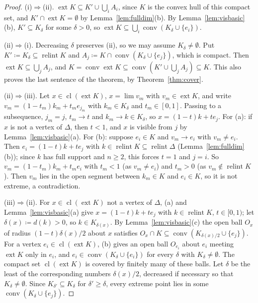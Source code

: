 \documentclass[11pt]{article}
\DeclareMathOperator{\conv}{conv}
\DeclareMathOperator{\relint}{relint}
\DeclareMathOperator{\ext}{ext}
\DeclareMathOperator{\cl}{cl}
\theoremstyle{plain}
\theoremstyle{definition}
\theoremstyle{remark}
\begin{document}
\begin{proof}
(i)$\Rightarrow$(ii). $\ext K\subseteq K'\cup\bigcup_iA_i$, since $K$ is the convex hull of
this compact set, and $K'\cap\ext K=\emptyset$ by Lemma~\ref{lem:fulldim}(b). By
Lemma~\ref{lem:visbasic}(b), $K'\subseteq K_\delta$ for some $\delta>0$, so $\ext
K\subseteq\bigcup_i\conv(K_\delta\cup\{e_i\})$.

(ii)$\Rightarrow$(i). Decreasing $\delta$ preserves (ii), so we may assume $K_\delta\neq
\emptyset$. Put $K'\coloneqq K_\delta\subseteq\relint K$ and $A_j\coloneqq K\cap
\conv(K_\delta\cup\{e_j\})$, which is compact. Then $\ext K\subseteq\bigcup_jA_j$, and
$K=\conv\ext K\subseteq\conv(K'\cup\bigcup_jA_j)\subseteq K$. This also proves the last
sentence of the theorem, by Theorem~\ref{thm:cover}.

(ii)$\Rightarrow$(iii). Let $x\in\cl(\ext K)$, $x=\lim v_m$ with $v_m\in\ext K$, and write
$v_m=(1-t_m)k_m+t_me_{j_m}$ with $k_m\in K_\delta$ and $t_m\in[0,1]$. Passing to a
subsequence, $j_m=j$, $t_m\to t$ and $k_m\to k\in K_\delta$, so $x=(1-t)k+te_j$. For (a):
if $x$ is not a vertex of $\Delta$, then $t<1$, and $x$ is visible from $j$ by
Lemma~\ref{lem:visbasic}(a). For (b): suppose $e_i\in K$ and $v_m\to e_i$ with $v_m\neq
e_i$. Then $e_i=(1-t)k+te_j$ with $k\in\relint K\subseteq\relint\Delta$
(Lemma~\ref{lem:fulldim}(b)); since $k$ has full support and $n\ge2$, this forces $t=1$
and $j=i$. So $v_m=(1-t_m)k_m+t_me_i$ with $t_m<1$ (as $v_m\ne e_i$) and $t_m>0$ (as
$v_m\notin\relint K$). Then $v_m$ lies in the open segment between $k_m\in K$ and $e_i\in
K$, so it is not extreme, a contradiction.

(iii)$\Rightarrow$(ii). For $x\in\cl(\ext K)$ not a vertex of $\Delta$, (a) and
Lemma~\ref{lem:visbasic}(a) give $x=(1-t)k+te_j$ with $k\in\relint K$, $t\in[0,1)$; let
$\delta(x)\coloneqq d(k)>0$, so $k\in K_{\delta(x)}$. By Lemma~\ref{lem:visbasic}(c) the open
ball $O_x$ of radius $(1-t)\delta(x)/2$ about $x$ satisfies $O_x\cap K\subseteq
\conv(K_{\delta(x)/2}\cup\{e_j\})$. For a vertex $e_i\in\cl(\ext K)$, (b) gives an open
ball $O_{e_i}$ about $e_i$ meeting $\ext K$ only in $e_i$, and $e_i\in\conv(K_\delta\cup
\{e_i\})$ for every $\delta$ with $K_\delta\ne\emptyset$. The compact set $\cl(\ext K)$ is
covered by finitely many of these balls. Let $\delta$ be the least of the corresponding
numbers $\delta(x)/2$, decreased if necessary so that $K_\delta\neq\emptyset$. Since
$K_{\delta'}\subseteq K_\delta$ for $\delta'\ge\delta$, every extreme point lies in some
$\conv(K_\delta\cup\{e_j\})$.
\end{proof}
\end{document}
